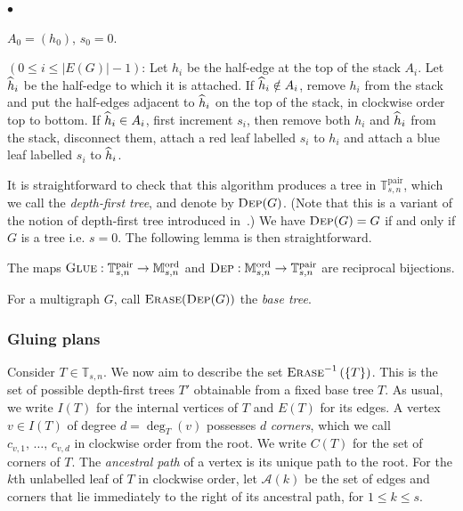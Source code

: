 \documentclass[AHL,Unicode,longabstracts,published]{cedram}
\newenvironment{steplist} {
\begin{list}
{$\bullet$} {\setlength{\labelwidth}{100pt}
\setlength{\leftmargin}{80pt}
\setlength{
\itemsep}{\parsep}}} {\end{list}}
\newcommand{\ord}{\mathrm{ord}}
\newcommand{\pair}{\mathrm{pair}}
\newcommand{\cA}{\mathcal{A}}
\newcommand{\A}{\mathbb{T}}
\newcommand{\M}{\mathbb{M}}
\let\oldhat\hat
\renewcommand*{\hat}[1]{\mathchoice{\widehat{#1}}{\widehat{#1}}{\oldhat{#1}}{\oldhat{#1}}}
\begin{document}
\begin{steplist}
\item[{\sc Initialization}] $A_0=(h_0)$, $s_0 = 0$.
\item[{\sc Step $i$}\hspace{38pt}]$(0\leq i\leq |E(G)|-1)$: Let $h_{i}$ be the half-edge at the top of the stack $A_i$. Let $\hat{h}_i$ be the half-edge to which it is attached. If $\hat{h}_i\notin A_i$, remove $h_i$ from the stack and put the half-edges adjacent to $\hat{h}_i$ on the top of the stack, in clockwise order top to bottom. If $\hat{h}_i\in A_i$, first increment $s_i$, then remove both $h_i$ and $\hat{h}_i$ from the stack, disconnect them, attach a red leaf labelled $s_i$ to $h_i$ and attach a blue leaf labelled $s_i$ to $\hat{h}_i$.
\end{steplist} It is straightforward to check that this algorithm produces a tree in $\A_{s,n}^{\pair}$, which we call the \emph{depth-first tree}, and denote by $\textsc{Dep}(G)$. (Note that this is a variant of the notion of depth-first tree introduced in~\cite{ABBrGo12}.) We have $\textsc{Dep}(G)=G$ if and only if $G$ is a tree i.e. $s=0$. The following lemma is then straightforward.

\begin{lemm}
The maps $\textsc{Glue}:\A_{s,n}^{\pair}\rightarrow\M_{s,n}^{\ord}$ and $\textsc{Dep}:\M_{s,n}^{\ord}\rightarrow\A_{s,n}^{\pair}$ are reciprocal bijections.
\end{lemm}

For a multigraph $G$, call $\textsc{Erase}(\textsc{Dep}(G))$ the \emph{base tree}.

\subsubsection{Gluing plans}
Consider $T\in \A_{s,n}$. We now aim to describe the set $\textsc{Erase}^{-1}\left(\{T\}\right)$. This is the set of possible depth-first trees $T'$ obtainable from a fixed base tree $T$. As usual, we write $I(T)$ for the internal vertices of $T$ and $E(T)$ for its edges. A vertex $v \in I(T)$ of degree $d=\deg_T(v)$ possesses $d$ \emph{corners}, which we call $c_{v,1}, \,\ldots,\,c_{v,d}$ in clockwise order from the root. We write $C(T)$ for the set of corners of $T$. The \emph{ancestral path} of a vertex is its unique path to the root. For the $k$th unlabelled leaf of $T$ in clockwise order, let $\cA(k)$ be the set of edges and corners that lie immediately to the right of its ancestral path, for $1 \le k \le s$.
\end{document}
